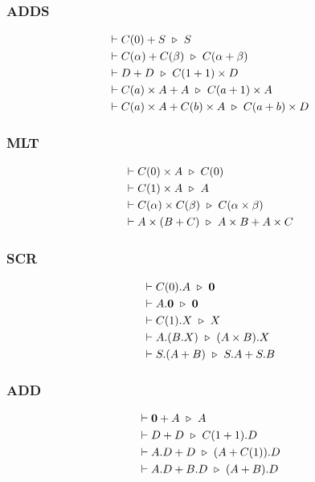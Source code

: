 \subsubsection*{\textsf{ADDS}}
\begin{align*}
    & \vdash C(0) + S \ \triangleright\  S \\
    & \vdash C(\alpha) + C(\beta) \ \triangleright\  C(\alpha + \beta) \\
    & \vdash D + D \ \triangleright\  C(1 + 1) \times D \\
    & \vdash C(a) \times A + A \ \triangleright\  C(a + 1) \times A \\
    & \vdash C(a) \times A + C(b) \times A \ \triangleright\  C(a + b) \times D \\
\end{align*}

\subsubsection*{\textsf{MLT}}
\begin{align*}
  & \vdash C(0) \times A \ \triangleright\  C(0) \\
  & \vdash C(1) \times A \ \triangleright\  A \\
  & \vdash C(\alpha) \times C(\beta) \ \triangleright\  C(\alpha \times \beta) \\
  & \vdash A \times (B + C) \ \triangleright\  A \times B + A \times C
\end{align*}

\subsubsection*{\textsf{SCR}}
\begin{align*}
    & \vdash C(0) . A \ \triangleright\  \mathbf{0} \\
    & \vdash A.\mathbf{0} \ \triangleright\  \mathbf{0} \\
    & \vdash C(1).X \ \triangleright\  X \\
    & \vdash A.(B.X) \ \triangleright\  (A \times B).X \\
    & \vdash S.(A + B) \ \triangleright\  S.A + S.B
\end{align*}

\subsubsection*{\textsf{ADD}}
\begin{align*}
    & \vdash \mathbf{0} + A \ \triangleright\  A \\
    & \vdash D + D \ \triangleright\  C(1 + 1).D \\
    & \vdash A.D + D \ \triangleright\  (A + C(1)).D \\
    & \vdash A.D + B.D \ \triangleright\  (A + B).D \\
\end{align*}

